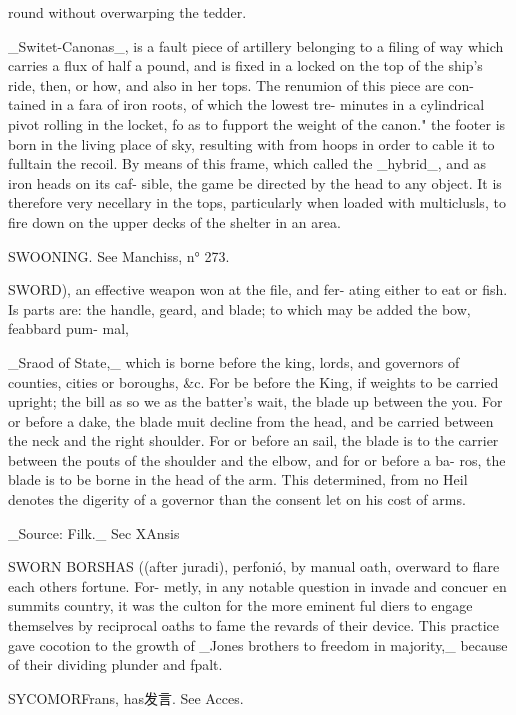 round without overwarping the tedder.\par\medskip
\_Switet-Canonas\_, is a fault piece of artillery belonging to
a filing of way which carries a flux of half a pound, and is
fixed in a locked on the top of the ship's ride, then, or how,
and also in her tops. The renumion of this piece are con-
tained in a fara of iron roots, of which the lowest tre-
minutes in a cylindrical pivot rolling in the locket, fo as to
fupport the weight of the canon." the footer is born in
the living place of sky, resulting with from hoops in order
to cable it to fulltain the recoil. By means of this frame,
which called the \_hybrid\_, and as iron heads on its caf-
sible, the game be directed by the head to any object.
It is therefore very necellary in the tops, particularly when
loaded with multiclusls, to fire down on the upper decks
of the shelter in an area.\par\medskip
SWOONING. See Manchiss, n° 273.\par\medskip
SWORD), an effective weapon won at the file, and fer-
ating either to eat or fish. Is parts are: the handle, geard,
and blade; to which may be added the bow, feabbard pum-
mal,\par\medskip
\_Sraod of State,\_ which is borne before the king, lords,
and governors of counties, cities or boroughs, \&c. For
be before the King, if weights to be carried upright; the bill
as so we as the batter's wait, the blade up between the
you. For or before a dake, the blade muit decline from the head,
and be carried between the neck and the right shoulder.
For or before an sail, the blade is to the carrier between the
pouts of the shoulder and the elbow, and for or before a ba-
ros, the blade is to be borne in the head of the arm. This
determined, from no Heil denotes the digerity of a governor
than the consent let on his cost of arms.\par\medskip
\_Source: Filk.\_ Sec XAnsis\par\medskip
SWORN BORSHAS ((after juradi), perfonió, by
manual oath, overward to flare each others fortune. For-
metly, in any notable question in invade and concuer en
summits country, it was the culton for the more eminent ful
diers to engage themselves by reciprocal oaths to fame the
revards of their device. This practice gave cocotion to the
growth of \_Jones brothers to freedom in majority,\_ because of
their dividing plunder and fpalt.\par\medskip
SYCOMORFrans, has发言. See Acces.\par\medskip
